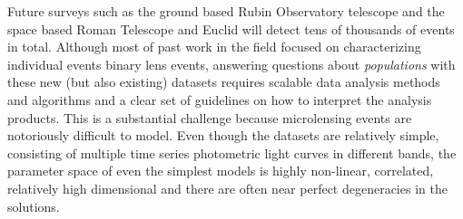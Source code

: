 \documentclass[11pt]{report}
\begin{document}
Future surveys such as the ground based Rubin Observatory
\citep{2019ApJ...873..111I} telescope and the space based Roman Telescope
\citep{2019ApJS..241....3P} and Euclid \citep{2022arXiv220209475B} will detect
tens of thousands of events in total. Although most of past work in the field
focused on characterizing individual events binary lens events, answering
questions about \emph{populations} with these new (but also existing) datasets
requires scalable data analysis methods and algorithms and a clear set of
guidelines on how to interpret the analysis products. This is a substantial
challenge because microlensing events are notoriously difficult to model. Even
though the datasets are relatively simple, consisting of multiple time series
photometric light curves in different bands, the parameter space of even the
simplest models is highly non-linear, correlated, relatively high dimensional
and there are often near perfect degeneracies in the solutions.
\end{document}
